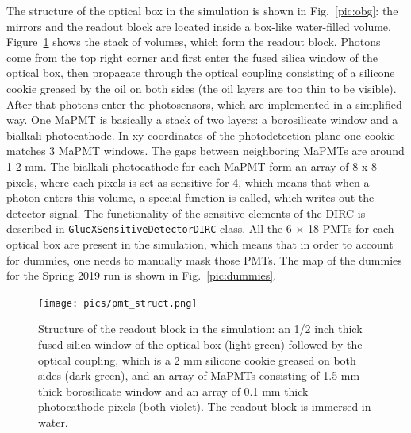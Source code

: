 The structure of the optical box in the simulation is shown in Fig.~\ref{pic:obg}: the mirrors and the readout block are located inside a box-like water-filled volume. Figure~\ref{pic:pmt_struct} shows the stack of volumes, which form the readout block. Photons come from the top right corner and first enter the fused silica window of the optical box, then propagate through the optical coupling consisting of a silicone cookie greased by the oil on both sides (the oil layers are too thin to be visible). After that photons enter the photosensors, which are implemented in a simplified way. One MaPMT is basically a stack of two layers: a borosilicate window and a bialkali photocathode. In xy coordinates of the  photodetection plane one cookie matches 3 MaPMT windows. The gaps between neighboring MaPMTs are around 1-2 mm. The bialkali photocathode for each MaPMT form an array of 8 x 8 pixels, where each pixels is set as sensitive for {\geant}4, which means that when a photon enters this volume, a special function is called, which writes out the detector signal. The functionality of the sensitive elements of the \gluex DIRC is described in \texttt{GlueXSensitiveDetectorDIRC} class. All the 6 $\times$ 18 PMTs for each optical box are present in the simulation, which means that in order to account for dummies, one needs to manually mask those PMTs. The map of the dummies for the Spring 2019 run is shown in Fig.~\ref{pic:dummies}.

\begin{figure}[!h]
\centering
\texttt{[image: pics/pmt\_struct.png]}
\caption{\label{pic:pmt_struct}
Structure of the readout block in the simulation: an 1/2 inch thick fused silica window of the optical box (light green) followed by the optical coupling, which is a 2 mm silicone cookie greased on both sides (dark green), and an array of MaPMTs consisting of 1.5 mm thick borosilicate window and an array of 0.1 mm thick photocathode pixels (both violet). The readout block is immersed in water.
}
\end{figure}

